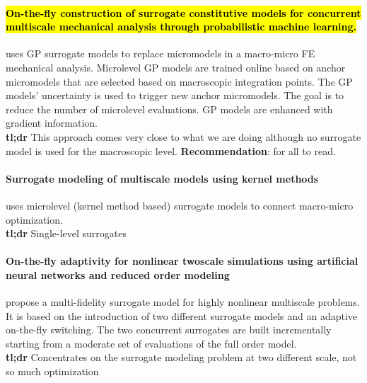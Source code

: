 \documentclass[preprint,12pt]{elsarticle}
\begin{document}
\paragraph{\hl{On-the-fly construction of surrogate constitutive models for concurrent multiscale mechanical analysis through probabilistic machine learning.}}
\cite{rocha2020fly} uses GP surrogate models to replace micromodels in a macro-micro FE mechanical analysis. Microlevel GP models are trained online based on anchor micromodels that are selected based on macroscopic integration points. The GP models' uncertainty is used to trigger new anchor micromodels. The goal is to reduce the number of microlevel evaluations. GP models are enhanced with gradient information. 
\\ \textbf{tl;dr} This approach comes very close to what we are doing although no surrogate model is used for the macroscopic level. \textbf{Recommendation}: for all to read.

\paragraph{Surrogate modeling of multiscale models using kernel methods}
\cite{wirtz2015surrogate} uses microlevel (kernel method based) surrogate models to connect macro-micro optimization. 
\\ \textbf{tl;dr} Single-level surrogates

\paragraph{On-the-fly adaptivity for nonlinear twoscale simulations using artificial neural networks and reduced order modeling}
\cite{fritzen2019fly} propose a multi-fidelity surrogate model for highly nonlinear multiscale problems. It is based on the introduction of two different surrogate models and an adaptive on-the-fly switching. The two concurrent surrogates are built incrementally starting from a moderate set of evaluations of the full order model. 
\\ \textbf{tl;dr} Concentrates on the surrogate modeling problem at two different scale, not so much optimization
\end{document}
